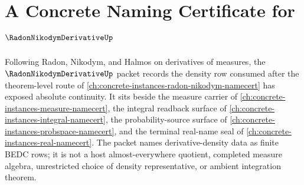 \chapter{A Concrete Naming Certificate for $\RadonNikodymDerivativeUp$}
\label{ch:concrete-instances-radon-nikodym-derivative-namecert}

Following Radon, Nikodym, and Halmos on derivatives of measures, the $\RadonNikodymDerivativeUp$ packet records the density row consumed after the theorem-level route of \autoref{ch:concrete-instances-radon-nikodym-namecert} has exposed absolute continuity. It sits beside the measure carrier of \autoref{ch:concrete-instances-measure-namecert}, the integral readback surface of \autoref{ch:concrete-instances-integral-namecert}, the probability-source surface of \autoref{ch:concrete-instances-probspace-namecert}, and the terminal real-name seal of \autoref{ch:concrete-instances-real-namecert}. The packet names derivative-density data as finite BEDC rows; it is not a host almost-everywhere quotient, completed measure algebra, unrestricted choice of density representative, or ambient integration theorem.

